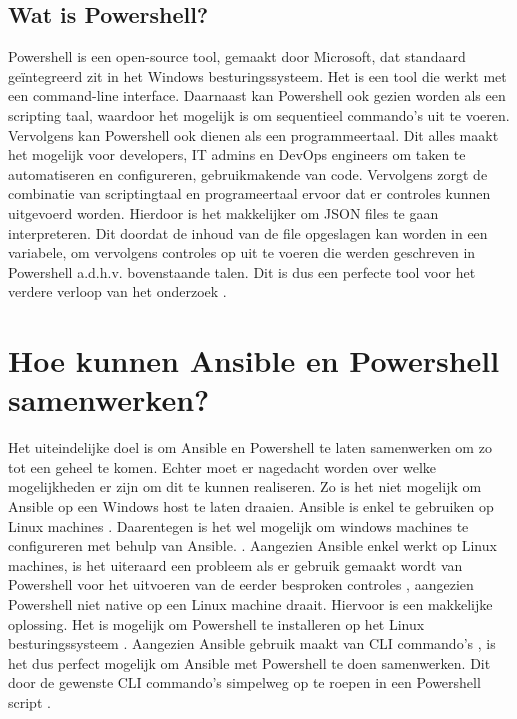 \subsection{Wat is Powershell?}
Powershell is een open-source tool, gemaakt door Microsoft, dat standaard geïntegreerd zit in het Windows besturingssysteem. Het is een tool die werkt met een command-line interface. Daarnaast kan Powershell ook gezien worden als een scripting taal, waardoor het mogelijk is om sequentieel commando's uit te voeren. Vervolgens kan Powershell ook dienen als een programmeertaal. Dit alles maakt het mogelijk voor developers, IT admins en DevOps engineers om taken te automatiseren en configureren, gebruikmakende van code. Vervolgens zorgt de combinatie van scriptingtaal en programeertaal ervoor dat er controles kunnen uitgevoerd worden. Hierdoor is het makkelijker om JSON files te gaan interpreteren. Dit doordat de inhoud van de file opgeslagen kan worden in een variabele, om vervolgens controles op uit te voeren die werden geschreven in Powershell a.d.h.v. bovenstaande talen.  Dit is dus een perfecte tool voor het verdere verloop van het onderzoek \autocite{BasuMallick2022}.

\section{Hoe kunnen Ansible en Powershell samenwerken?}
Het uiteindelijke doel is om Ansible en Powershell te laten samenwerken om zo tot een geheel te komen. Echter moet er nagedacht worden over welke mogelijkheden er zijn om dit te kunnen realiseren. Zo is het niet mogelijk om Ansible op een Windows host te laten draaien. Ansible is enkel te gebruiken op Linux machines  \autocite{Hat2020}. Daarentegen is het wel mogelijk om windows machines te configureren met behulp van Ansible. \autocite{Ansible2023} . Aangezien Ansible enkel werkt op Linux machines, is het uiteraard een probleem als er gebruik gemaakt wordt van Powershell voor het uitvoeren van de eerder besproken controles , aangezien Powershell niet native op een Linux machine draait. 
Hiervoor is een makkelijke oplossing. Het is mogelijk om Powershell te installeren op het Linux besturingssysteem \autocite{MicrosoftAnsible2023}. Aangezien Ansible gebruik maakt van CLI commando's , is het dus perfect mogelijk om Ansible met Powershell te doen samenwerken. Dit door de gewenste CLI commando's simpelweg op te roepen in een Powershell script \autocite{Ansible2023}.

